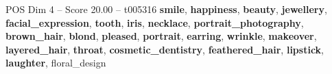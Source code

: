\begin{textsample}{POS Dim 4 – Score 20.00 – t005316}  \label{ex:f4_pos_018}
\textbf{smile}, \textbf{happiness}, \textbf{beauty}, \textbf{jewellery}, \textbf{facial\_expression}, \textbf{tooth}, \textbf{iris}, \textbf{necklace}, \textbf{portrait\_photography}, \textbf{brown\_hair}, \textbf{blond}, \textbf{pleased}, \textbf{portrait}, \textbf{earring}, \textbf{wrinkle}, \textbf{makeover}, \textbf{layered\_hair}, \textbf{throat}, \textbf{cosmetic\_dentistry}, \textbf{feathered\_hair}, \textbf{lipstick}, \textbf{laughter}, floral\_design

\end{textsample}
